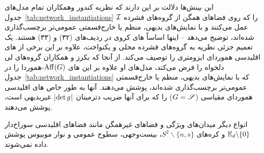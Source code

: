 این بینش‌ها دلالت بر این دارند که نظریه کندور وهمکاران\cite{Kondor2018-GENERAL} تمام مدل‌های جدول~\ref{tab:network_instantiations} را که روی فضاهای همگن از گروه‌های فشرده $\mathcal{I}$ عمل می‌کنند و با نمایش‌های بدیهی، منظم یا خارج‌قسمتی عمومی‌تر برچسب‌گذاری شده‌اند، توضیح می‌دهد -- اینها اساساً های کروی در ردیف‌های (۳۲) و (۳۳) هستند.
یک تعمیم جزئی نظریه به گروه‌های فشرده محلی و یکنواخت، علاوه بر این برخی از های اقلیدسی هموردای ایزومتری را توصیف می‌کند.
از آنجا که بکرز و همکاران\cite{bekkers2020bspline} گروه‌های لی دلخواه را فرض می‌کند، مدل‌های او علاوه بر این های $\operatorname{Aff}(G)$-هموردا را در جدول~\ref{tab:network_instantiations} که با نمایش‌های بدیهی، منظم یا خارج‌قسمتی عمومی‌تر برچسب‌گذاری شده‌اند، پوشش می‌دهند.
آنها به طور خاص های اقلیدسی هموردای مقیاسی ($G=\mathscr{S}$) را که برای آنها ضریب دترمینان $|\mkern-2mu \det g \mkern1mu|$ غیربدیهی است، پوشش می‌دهند.


انواع دیگر میدان‌های ویژگی و فضاهای غیرهمگن مانند فضاهای اقلیدسی سوراخ‌دار $\mathbb{E}_d\backslash\{0\}$ و کره‌های $S^2\backslash\{n,s\}$، بیست‌وجهی، سطوح عمومی و نوار موبیوس پوشش داده نمی‌شوند.